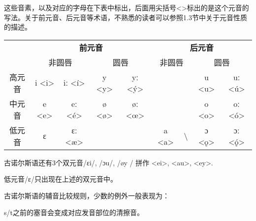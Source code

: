 
这些音素，以及对应的字母在下表中标出，后面用尖括号<>标出的是这个元音的写法。关于前元音、后元音等术语，不熟悉的读者可以参照1.3节中关于元音性质的描述。

\begin{table}[H]
    \centering
    \begin{tabular}{@{}ccccccccc@{}}
        \toprule
               & \multicolumn{4}{c}{\textbf{前元音}} & \multicolumn{4}{c}{\textbf{后元音}}                                                                                                                                                                                 \\ \cmidrule(l){2-9}
               & \multicolumn{2}{c}{非圆唇}          & \multicolumn{2}{c}{圆唇}            & \multicolumn{2}{c}{非圆唇}   & \multicolumn{2}{c}{圆唇}                                                                                                                       \\ \cmidrule(l){2-9}
        高元音 & i \textless{}i\textgreater{}        & iː \textless{}í\textgreater{}       & y \textless{}y\textgreater{} & yː \textless{}ý\textgreater{} &                              &                  & u \textless{}u\textgreater{} & uː \textless{}ú\textgreater{} \\
        中元音 & e \textless{}e\textgreater{}        & eː \textless{}é\textgreater{}       & ø \textless{}ø\textgreater{} & øː \textless{}œ\textgreater{} &                              &                  & o \textless{}o\textgreater{} & oː \textless{}ó\textgreater{} \\
        低元音 & ɛ                                   & ɛː \textless{}æ\textgreater{}       &                              &                               & a \textless{}a\textgreater{} & \textbackslash{} & ɔ \textless{}ǫ\textgreater{} & ɔː \textless{}ǫ́\textgreater{} \\ \bottomrule
    \end{tabular}
\end{table}

古诺尔斯语还有3个双元音/ɛi/, /ɔu/, /øy / 拼作 <ei>, <au>, <ey>.

低元音/ɛ/只出现在上述的双元音中。

古诺尔斯语的辅音比较规则，少数的例外一般表现为：

\begin{info}
    s/t之前的塞音会变成对应发音部位的清擦音。\footnotemark
\end{info}

